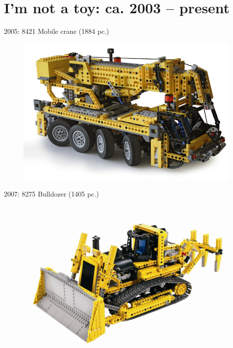 \documentclass[xcolor=dvipsnames]{beamer}
\begin{document}
\section{I'm not a toy: ca. 2003 -- present}

\begin{frame}[fragile]{2005: 8421 Mobile crane (1884 pc.)}
\begin{figure}[H]
 \centering
 \includegraphics[width=0.99\textwidth]{2005_8421_crane.jpg}
\end{figure}
\end{frame}

\begin{frame}[fragile]{2007: 8275 Bulldozer (1405 pc.)}
\begin{figure}[H]
 \centering
 \includegraphics[width=0.99\textwidth]{2007_8275_bulldozer.jpg}
\end{figure}
\end{frame}
\end{document}
